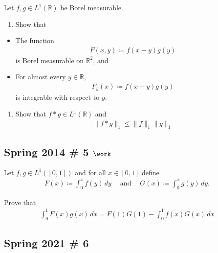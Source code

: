 Let \(f, g \in L^1({\mathbb{R}})\) be Borel measurable.

\begin{enumerate}
\def\labelenumi{\arabic{enumi}.}
\tightlist
\item
  Show that
\end{enumerate}

\begin{itemize}
\tightlist
\item
  The function
  \begin{align*}F(x, y) \coloneqq f(x-y) g(y)\end{align*}
  is Borel measurable on \({\mathbb{R}}^2\), and
\item
  For almost every \(y\in {\mathbb{R}}\),
  \begin{align*}F_y(x) \coloneqq f(x-y)g(y)\end{align*}
  is integrable with respect to \(y\).
\end{itemize}

\begin{enumerate}
\def\labelenumi{\arabic{enumi}.}
\setcounter{enumi}{1}
\tightlist
\item
  Show that \(f\ast g \in L^1({\mathbb{R}})\) and
  \begin{align*}
  \|f * g\|_{1} \leq \|f\|_{1} \|g\|_{1}
  \end{align*}
\end{enumerate}

\hypertarget{spring-2014-5-work}{%
\subsection{\texorpdfstring{Spring 2014 \# 5
\(\work\)}{Spring 2014 \# 5 \textbackslash work}}\label{spring-2014-5-work}}

Let \(f, g \in L^1([0, 1])\) and for all \(x\in [0, 1]\) define
\begin{align*}
F(x) \coloneqq\int _{0}^{x} f(y) \, dy 
{\quad \operatorname{and} \quad}
G(x)\coloneqq\int _{0}^{x} g(y) \, dy.
\end{align*}

Prove that
\begin{align*}
\int _{0}^{1} F(x) g(x) \, dx = 
F(1) G(1) - \int _{0}^{1} f(x) G(x) \, dx
\end{align*}

\hypertarget{spring-2021-6}{%
\subsection{Spring 2021 \# 6}\label{spring-2021-6}}

